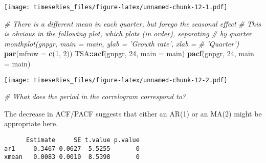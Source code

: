 \documentclass[]{book}
\newenvironment{Shaded}{\begin{snugshade}}{\end{snugshade}}
\newcommand{\CommentTok}[1]{\textcolor[rgb]{0.56,0.35,0.01}{\textit{#1}}}
\newcommand{\DataTypeTok}[1]{\textcolor[rgb]{0.13,0.29,0.53}{#1}}
\newcommand{\DecValTok}[1]{\textcolor[rgb]{0.00,0.00,0.81}{#1}}
\newcommand{\KeywordTok}[1]{\textcolor[rgb]{0.13,0.29,0.53}{\textbf{#1}}}
\newcommand{\NormalTok}[1]{#1}
\newcommand{\OperatorTok}[1]{\textcolor[rgb]{0.81,0.36,0.00}{\textbf{#1}}}
\newcommand{\OtherTok}[1]{\textcolor[rgb]{0.56,0.35,0.01}{#1}}
\newcommand{\StringTok}[1]{\textcolor[rgb]{0.31,0.60,0.02}{#1}}
\begin{document}
\texttt{[image: timeseRies\_files/figure-latex/unnamed-chunk-12-1.pdf]}

\begin{Shaded}
\begin{Highlighting}[]
\CommentTok{# There is a different mean in each quarter, but forego the seasonal effect}
\CommentTok{# This is obvious in the following plot, which plots (in order), separating}
\CommentTok{# by quarter monthplot(gnpgr, main = main, ylab = 'Growth rate', xlab =}
\CommentTok{# 'Quarter')}
\KeywordTok{par}\NormalTok{(}\DataTypeTok{mfrow =} \KeywordTok{c}\NormalTok{(}\DecValTok{1}\NormalTok{, }\DecValTok{2}\NormalTok{))}
\NormalTok{TSA}\OperatorTok{::}\KeywordTok{acf}\NormalTok{(gnpgr, }\DecValTok{24}\NormalTok{, }\DataTypeTok{main =}\NormalTok{ main)}
\KeywordTok{pacf}\NormalTok{(gnpgr, }\DecValTok{24}\NormalTok{, }\DataTypeTok{main =}\NormalTok{ main)}
\end{Highlighting}
\end{Shaded}

\texttt{[image: timeseRies\_files/figure-latex/unnamed-chunk-12-2.pdf]}

\begin{Shaded}
\begin{Highlighting}[]
\CommentTok{# What does the period in the correlogram correspond to?}
\end{Highlighting}
\end{Shaded}

The decrease in ACF/PACF suggests that either an AR(1) or an MA(2) might
be appropriate here.

\begin{Shaded}
\end{Shaded}

\begin{verbatim}
      Estimate     SE t.value p.value
ar1     0.3467 0.0627  5.5255       0
xmean   0.0083 0.0010  8.5398       0
\end{verbatim}

\begin{Shaded}
\end{Shaded}
\end{document}

